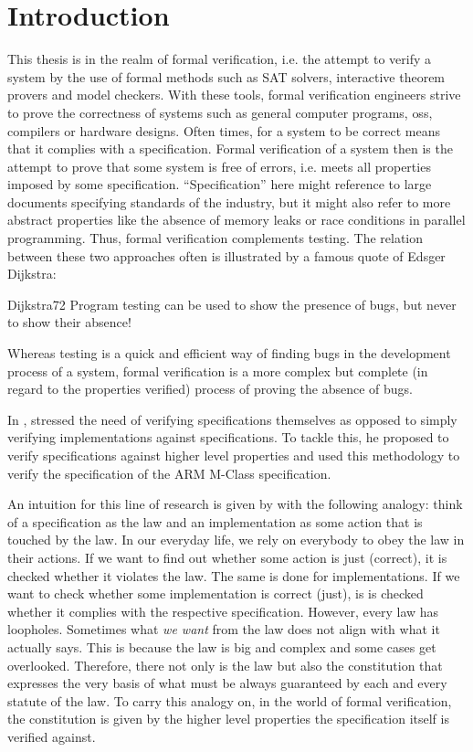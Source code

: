 
\section{Introduction}
\label{sec:introduction}

This thesis is in the realm of formal verification, i.e. the attempt to verify a system by the use of formal methods such as SAT solvers, interactive theorem provers and model checkers.
With these tools, formal verification engineers strive to prove the correctness of systems such as general computer programs, \glspl{os}, compilers or hardware designs.
Often times, for a system to be correct means that it complies with a specification.
Formal verification of a system then is the attempt to prove that some system is free of errors, i.e. meets all properties imposed by some specification.
\enquote{Specification} here might reference to large documents specifying standards of the industry, but it might also refer to more abstract properties like the absence of memory leaks or race conditions in parallel programming.
Thus, formal verification complements testing.
The relation between these two approaches often is illustrated by a famous quote of Edsger Dijkstra:
\begin{displaycquote}[p.6]{Dijkstra72}
    Program testing can be used to show the presence of bugs, but never to show their absence!
\end{displaycquote}

Whereas testing is a quick and efficient way of finding bugs in the development process of a system, formal verification is a more complex but complete (in regard to the properties verified) process of proving the absence of bugs.

In  \cite{Reid17}, \citeauthor{Reid17} stressed the need of verifying specifications themselves as opposed to simply verifying implementations against specifications.
To tackle this, he proposed to verify specifications against higher level properties and used this methodology to verify the specification of the ARM M-Class specification.

An intuition for this line of research is given by \citeauthor{Reid17} with the following analogy: think of a specification as the law and an implementation as some action that is touched by the law.
In our everyday life, we rely on everybody to obey the law in their actions.
If we want to find out whether some action is just (correct), it is checked whether it violates the law.
The same is done for implementations.
If we want to check whether some implementation is correct (just), is is checked whether it complies with the respective specification.
However, every law has loopholes.
Sometimes what \textit{we want} from the law does not align with what it actually says.
This is because the law is big and complex and some cases get overlooked.
Therefore, there not only is the law but also the constitution that expresses the very basis of what must be always guaranteed by each and every statute of the law.
To carry this analogy on, in the world of formal verification, the constitution is given by the higher level properties the specification itself is verified against.

